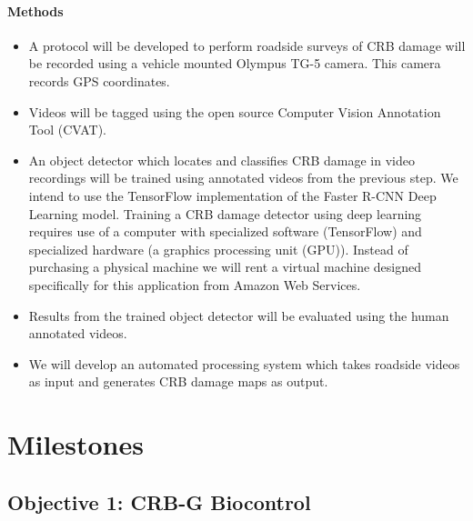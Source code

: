 \documentclass[14pt,english,letterpaper]{scrartcl}
\begin{document}
\paragraph{Methods}

\begin{itemize}
	\item A protocol will be developed to perform roadside surveys of CRB damage will be recorded using a vehicle mounted Olympus TG-5 camera. This camera records GPS coordinates.
	\item Videos will be tagged using the open source Computer Vision Annotation Tool (CVAT).
	\item An object detector which locates and classifies CRB damage in video recordings will be trained using annotated videos from the previous step. We intend to use the TensorFlow implementation of the Faster R-CNN Deep Learning model. Training a CRB damage detector using deep learning requires use of a computer with specialized software (TensorFlow) and specialized hardware (a graphics processing unit (GPU)). Instead of purchasing a physical machine we will rent a virtual machine designed specifically for this application from Amazon Web Services.  
	\item Results from the trained object detector will be evaluated using the human annotated videos.
	\item We will develop an automated processing system which takes roadside videos as input and generates CRB damage maps as output.
\end{itemize}

\section{Milestones} 


\subsection{Objective 1: CRB-G Biocontrol}
\end{document}
